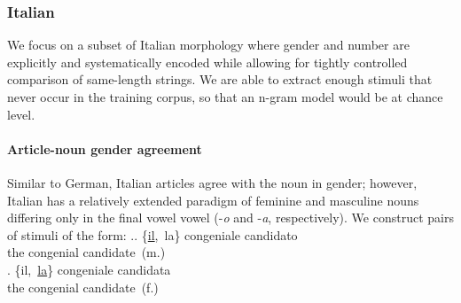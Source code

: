 
\subsubsection{Italian} %
We
focus on a subset of Italian morphology where gender and number are
explicitly and systematically encoded while allowing for tightly
controlled comparison of same-length strings. We are able to extract
enough stimuli that never occur in the training corpus, so that an
n-gram model would be at chance level.

\paragraph{Article-noun gender agreement}

Similar to German, Italian articles agree with the noun in gender; however, Italian has a relatively extended paradigm of feminine and masculine nouns differing only in the final vowel vowel (-\emph{o} and -\emph{a}, respectively). We construct pairs of stimuli of the form:
\ex.\ag. \{\underline{il},\ la\}  congeniale  candidato \\
the congenial candidate\ (m.) \\
\bg.  \{il,\ \underline{la}\}  congeniale  candidata \\
the congenial candidate\ (f.) \\


